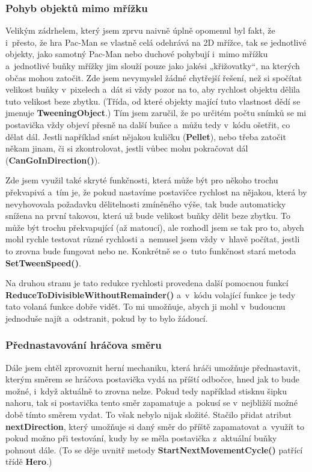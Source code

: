 \documentclass[a4]{article}
\begin{document}
\subsubsection{Pohyb objektů mimo mřížku} \label{tweening}
Velikým zádrhelem, který jsem zprvu naivně úplně opomenul byl fakt, že i~přesto, že hra Pac-Man se vlastně celá odehrává na 2D mřížce, tak se jednotlivé objekty, jako samotný Pac-Man nebo duchové pohybují i~mimo mřížku a~jednotlivé buňky mřížky jim slouží pouze jako jakési „křižovatky“, na kterých občas mohou zatočit. Zde jsem nevymyslel žádné chytřejší řešení, než si spočítat velikost buňky v~pixelech a~dát si vždy pozor na to, aby rychlost objektu dělila tuto velikost beze zbytku. (Třída, od které objekty mající tuto vlastnost dědí se jmenuje \textbf{TweeningObject}.) Tím jsem zaručil, že po určitém počtu snímků se mi postavička vždy objeví přesně na další buňce a~můžu tedy v~kódu ošetřit, co dělat dál. Jestli například sníst nějakou kuličku (\textbf{Pellet}), nebo třeba zatočit někam jinam, či si zkontrolovat, jestli vůbec mohu pokračovat dál (\textbf{CanGoInDirection()}).

Zde jsem využil také skryté funkčnosti, která může být pro někoho trochu překvapivá a~tím je, že pokud nastavíme postavičce rychlost na nějakou, která by nevyhovovala požadavku dělitelnosti zmíněného výše, tak bude automaticky snížena na první takovou, která už bude velikost buňky dělit beze zbytku. To může být trochu překvapující (až matoucí), ale rozhodl jsem se tak pro to, abych mohl rychle testovat různé rychlosti a~nemusel jsem vždy v~hlavě počítat, jestli to zrovna bude fungovat nebo ne. Konkrétně se o~tuto funkčnost stará metoda \textbf{SetTweenSpeed()}. 

Na druhou stranu je tato redukce rychlosti provedena další pomocnou funkcí \textbf{ReduceToDivisibleWithoutRemainder()} a~v~kódu volající funkce je tedy tato volaná funkce dobře vidět. To mi umožňuje, abych ji mohl v~budoucnu jednoduše najít a~odstranit, pokud by to bylo žádoucí.

\subsubsection{Přednastavování hráčova směru}
Dále jsem chtěl zprovoznit herní mechaniku, která hráči umožňuje přednastavit, kterým směrem se hráčova postavička vydá na příští odbočce, hned jak to bude možné, i~když aktuálně to zrovna nelze. Pokud tedy například stisknu šipku nahoru, tak si postavička tento směr zapamatuje a~pokusí se v~nejbližší možné době tímto směrem vydat. To však nebylo nijak složité. Stačilo přidat atribut \textbf{nextDirection}, který umožňuje si daný směr do příště zapamatovat a~využít to pokud možno při testování, kudy by se měla postavička z~aktuální buňky pohnout dále. (To se děje uvnitř metody \textbf{StartNextMovementCycle()} patřící třídě \textbf{Hero}.)
\end{document}
